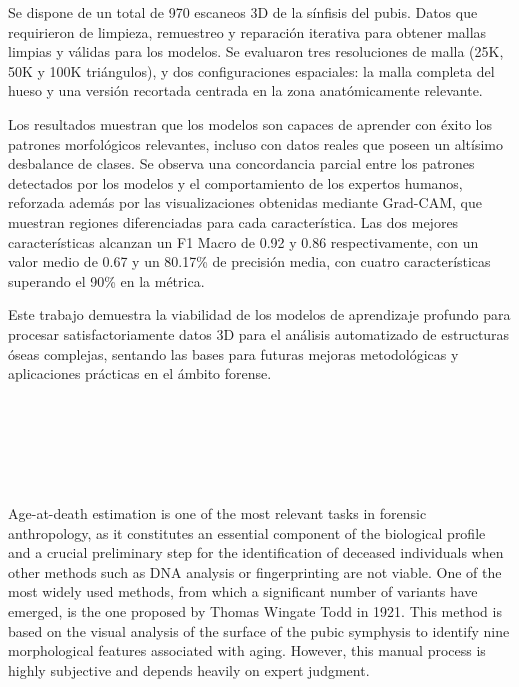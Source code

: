 Se dispone de un total de 970 escaneos 3D de la sínfisis del pubis. Datos que requirieron de limpieza, remuestreo y reparación iterativa para obtener mallas limpias y válidas para los modelos. Se evaluaron tres resoluciones de malla (25K, 50K y 100K triángulos), y dos configuraciones espaciales: la malla completa del hueso y una versión recortada centrada en la zona anatómicamente relevante.

Los resultados muestran que los modelos son capaces de aprender con éxito los patrones morfológicos relevantes, incluso con datos reales que poseen un altísimo desbalance de clases. Se observa una concordancia parcial entre los patrones detectados por los modelos y el comportamiento de los expertos humanos, reforzada además por las visualizaciones obtenidas mediante Grad-CAM, que muestran regiones diferenciadas para cada característica. Las dos mejores características alcanzan un F1 Macro de 0.92 y 0.86 respectivamente, con un valor medio de 0.67 y un 80.17\% de precisión media, con cuatro características superando el 90\% en la métrica.

Este trabajo demuestra la viabilidad de los modelos de aprendizaje profundo para procesar satisfactoriamente datos 3D para el análisis automatizado de estructuras óseas complejas, sentando las bases para futuras mejoras metodológicas y aplicaciones prácticas en el ámbito forense.

\newpage
\thispagestyle{empty}


\begin{center}
{\large\bfseries \myTitleENG} \\
\end{center}
\begin{center}
\myName \\
\end{center}

\vspace{0.7cm}
 \\

\vspace{0.7cm}
 \\

Age-at-death estimation is one of the most relevant tasks in forensic anthropology, as it constitutes an essential component of the biological profile and a crucial preliminary step for the identification of deceased individuals when other methods such as DNA analysis or fingerprinting are not viable. One of the most widely used methods, from which a significant number of variants have emerged, is the one proposed by Thomas Wingate Todd in 1921. This method is based on the visual analysis of the surface of the pubic symphysis to identify nine morphological features associated with aging. However, this manual process is highly subjective and depends heavily on expert judgment.

